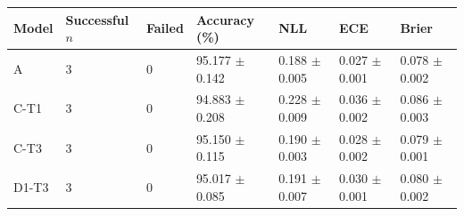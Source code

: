 \begin{tabular}{lllllll}
\toprule
Model & Successful $n$ & Failed & Accuracy (\%) & NLL & ECE & Brier \\
\midrule
A & 3 & 0 & 95.177 $\pm$ 0.142 & 0.188 $\pm$ 0.005 & 0.027 $\pm$ 0.001 & 0.078 $\pm$ 0.002 \\
C-T1 & 3 & 0 & 94.883 $\pm$ 0.208 & 0.228 $\pm$ 0.009 & 0.036 $\pm$ 0.002 & 0.086 $\pm$ 0.003 \\
C-T3 & 3 & 0 & 95.150 $\pm$ 0.115 & 0.190 $\pm$ 0.003 & 0.028 $\pm$ 0.002 & 0.079 $\pm$ 0.001 \\
D1-T3 & 3 & 0 & 95.017 $\pm$ 0.085 & 0.191 $\pm$ 0.007 & 0.030 $\pm$ 0.001 & 0.080 $\pm$ 0.002 \\
\bottomrule
\end{tabular}
